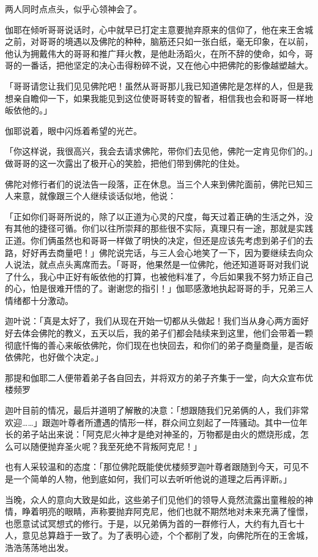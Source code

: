 \documentclass[twoside,openany]{book}
\begin{document}
两人同时点点头，似乎心领神会了。

伽耶在倾听哥哥说话时，心中就早已打定主意要抛弃原来的信仰了，他在来王舍城之前，对哥哥的境遇以及佛陀的种种，脑筋还只如一张白纸，毫无印象，在以前，他认为拥戴伟大的哥哥和推广拜火教，是他赴汤蹈火，在所不辞的使命，如今，哥哥的一番话，把他坚定的决心击得粉碎不说，又在他心中把佛陀的影像越塑越大。

「哥哥请您让我们见见佛陀吧！虽然从哥哥那儿我已知道佛陀是怎样的人，但是我想亲自瞻仰一下，如果我能见到这位使哥哥转变的智者，相信我也会和哥哥一样地皈依他的。」

伽耶说着，眼中闪烁着希望的光芒。

「你这样说，我很高兴，我会去请求佛陀，带你们去见他，佛陀一定肯见你们的。」做哥哥的这一次露出了极开心的笑脸，把他们带到佛陀的住处。

佛陀对修行者们的说法告一段落，正在休息。当三个人来到佛陀面前，佛陀已知三人来意，就像跟三个人继续谈话似地，他说：

「正如你们哥哥所说的，除了以正道为心灵的尺度，每天过着正确的生活之外，没有其他的捷径可循。你们以往所崇拜的那些很不实际，真理只有一途，那就是实践正道。你们俩虽然也和哥哥一样做了明快的决定，但还是应该先考虑到弟子们的去路，好好再去商量吧！」佛陀说完话，与三人会心地笑了一下，因为要继续去向众人说法，就点点头离席而去。「哥哥，他果然是一位佛陀，他还知道哥哥对我们说了什么，我心中正好有皈依他的打算，也被他料准了，今后如果我不努力矫正自己的心，怕是很难开悟的了。谢谢您的指引！」伽耶感激地执起哥哥的手，兄弟三人情绪都十分激动。

迦叶说：「真是太好了，我们从现在开始一切都从头做起！我们当从身心两方面好好去体会佛陀的教义，五天以后，我的弟子们都会陆续来到这里，他们会带着一颗彻底忏悔的善心来皈依佛陀，你们现在也快回去，和你们的弟子商量商量，是否皈依佛陀，也好做个决定。」

那提和伽耶二人便带着弟子各自回去，并将双方的弟子齐集于一堂，向大众宣布优楼频罗



迦叶目前的情况，最后并道明了解散的决意：「想跟随我们兄弟俩的人，我们非常欢迎……」跟迦叶尊者所遭遇的情形一样，群众间立刻起了一阵骚动。其中一位年长的弟子站出来说：「阿克尼火神才是绝对神圣的，万物都是由火的燃烧形成，怎么可以随便抛弃圣火呢？我至死绝不背叛阿克尼！」

也有人采较温和的态度：「那位佛陀既能使优楼频罗迦叶尊者跟随到今天，可见不是一个简单的人物，他到底如何，我们可以去听听他说的道理之后再评断。」

当晚，众人的意向大致是如此，这些弟子们见他们的领导人竟然流露出童稚般的神情，睁着明亮的眼睛，声称要抛弃阿克尼，他们也就不期然地对未来充满了憧憬，也愿意试试冥想式的修行。于是，以兄弟俩为首的一群修行人，大约有九百七十人，意见总算趋于一致了。为了表明心迹，个个都削了发，向佛陀所在的王舍城，浩浩荡荡地出发。
\end{document}
